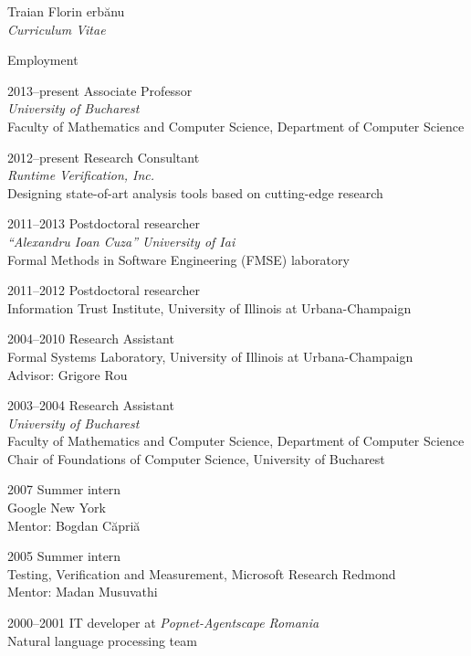 \documentclass[10pt]{article}
\newcommand{\sh}{\unichar{0537}}
\newcommand{\Sh}{\unichar{0536}}
\newcommand{\tz}{\unichar{0539}}
\newcommand{\Serbanuta}{{\Sh}er\-b{\u a}\-nu\-{\tz}{\u a}}
\newcommand{\Rosu}{Ro\-{\sh}u}
\begin{document}
\begin{cv}{Traian Florin \Serbanuta{}\\{\large \itshape Curriculum Vitae}}
\begin{cvlist}{Employment}
    \item[2013--present] Associate Professor\\
	 {\em University of Bucharest}\\
	 Faculty of Mathematics and Computer Science, Department of Computer Science
    \item[2012--present] Research Consultant\\
	 {\em Runtime Verification, Inc.}\\
	 Designing state-of-art analysis tools based on cutting-edge research
    \item[2011--2013] Postdoctoral researcher\\
     {\em ``Alexandru Ioan Cuza'' University of Ia{\sh}i}\\
    Formal Methods in Software Engineering (FMSE) laboratory
    \item[2011--2012] Postdoctoral researcher\\
    Information Trust Institute, University of Illinois at 
    Urbana-Champaign
    \item[2004--2010] Research Assistant\\
    Formal Systems Laboratory, University of Illinois at 
    Urbana-Champaign\\
    Advisor: Grigore \Rosu{}
    \item[2003--2004] Research Assistant\\
	 {\em University of Bucharest}\\
	 Faculty of Mathematics and Computer Science, Department of Computer Science
     Chair of Foundations of Computer Science, University of Bucharest
     \item[2007] Summer intern\\
     Google New York\\
     Mentor: Bogdan C{\u a}pri{\tz}{\u a}\\
     \item[2005] Summer intern\\
     Testing, Verification and Measurement, Microsoft Research Redmond\\
     Mentor: Madan Musuvathi
     \item[2000--2001] IT developer at {\em Popnet-Agentscape Romania}\\
     Natural language processing team
\end{cvlist}



\end{cv}
\end{document}
